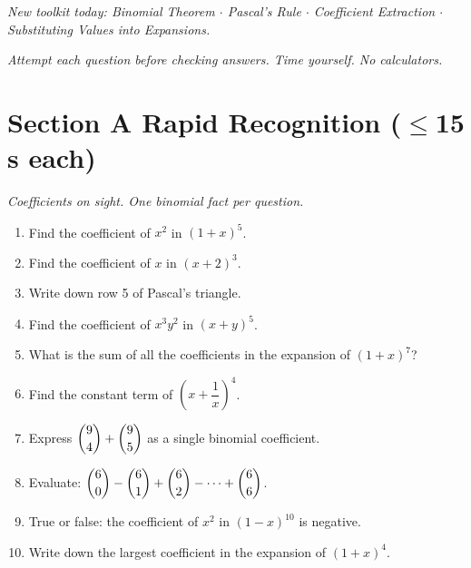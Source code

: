 \documentclass[11pt,a4paper]{article}
\begin{document}
\noindent\textit{New toolkit today: Binomial Theorem $\cdot$ Pascal's Rule $\cdot$ Coefficient Extraction $\cdot$ Substituting Values into Expansions.}

\vspace{2pt}
\noindent\textit{Attempt each question before checking answers. Time yourself. No calculators.}

\section*{Section A \quad Rapid Recognition \hfill{\normalfont\small($\leq$15 s each)}}

\noindent\textit{Coefficients on sight. One binomial fact per question.}

\begin{enumerate}

\item Find the coefficient of $x^2$ in $(1+x)^5$.

\item Find the coefficient of $x$ in $(x+2)^3$.

\item Write down row 5 of Pascal's triangle.

\item Find the coefficient of $x^3y^2$ in $(x+y)^5$.

\item What is the sum of all the coefficients in the expansion of $(1+x)^7$?

\item Find the constant term of $\left(x+\dfrac{1}{x}\right)^{4}$.

\item Express $\dbinom{9}{4}+\dbinom{9}{5}$ as a single binomial coefficient.

\item Evaluate: $\dbinom{6}{0}-\dbinom{6}{1}+\dbinom{6}{2}-\cdots+\dbinom{6}{6}$.

\item True or false: the coefficient of $x^2$ in $(1-x)^{10}$ is negative.

\item Write down the largest coefficient in the expansion of $(1+x)^4$.

\end{enumerate}
\end{document}
